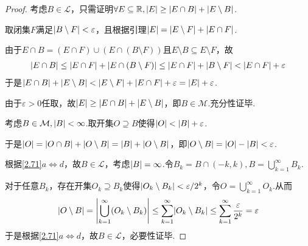 \begin{proof}
    考虑\(B \in \mathcal{L}\)，只需证明\(\forall E \subseteq \mathbb{R}, \abs*{E} \geq \abs*{E \cap B}+\abs*{E \setminus B}\).

    取闭集\(F\)满足\(\abs*{B \setminus F}<\varepsilon\)，且根据引理\(\abs*{E}=\abs*{E \setminus F}+\abs*{E \cap F}\).

    由于\(E \cap B=(E \cap F) \cup (E \cap (B \setminus F))\)且\(E \setminus B \subseteq E \setminus F\)，故
    \begin{align*}
        \abs*{E \cap B} \leq \abs*{E \cap F}+\abs*{E \cap (B \setminus F)} \leq \abs*{E \cap F}+\abs*{B \setminus F}<\abs*{E \cap F}+\varepsilon
    \end{align*}
    于是\(\abs*{E \cap B}+\abs*{E \setminus B}<\abs*{E \setminus F}+\abs*{E \cap F}+\varepsilon=\abs*{E}+\varepsilon\).
    
    由于\(\varepsilon>0\)任取，故\(\abs*{E} \geq \abs*{E \cap B}+\abs*{E \setminus B}\)，即\(B \in \mathcal{M}\).充分性证毕.

    考虑\(B \in \mathcal{M}, \abs*{B}<\infty\).取开集\(O \supseteq B\)使得\(\abs*{O}<\abs*{B}+\varepsilon\).

    于是\(\abs*{O}=\abs*{O \cap B}+\abs*{O \setminus B}=\abs*{B}+\abs*{O \setminus B}\)，即\(\abs*{O \setminus B}=\abs*{O}-\abs*{B}<\varepsilon\).

    根据\cref{2.71}\(a \Leftrightarrow d\)，故\(B \in \mathcal{L}\)，考虑\(\abs*{B}=\infty\).令\(B_k=B \cap (-k,k), B=\bigcup_{k=1}^\infty B_k\).

    对于任意\(B_k\)，存在开集\(O_k \supseteq B_k\)使得\(\abs*{O_k \setminus B_k}<\varepsilon/2^k\)，令\(O=\bigcup_{k=1}^\infty O_k\).从而
    \begin{align*}
        \abs*{O \setminus B}=\abs*{\bigcup_{k=1}^\infty (O_k \setminus B_k)} \leq \sum_{k=1}^\infty \abs*{O_k \setminus B_k} \leq \sum_{k=1}^\infty \frac{\varepsilon}{2^k}=\varepsilon
    \end{align*}
    于是根据\cref{2.71}\(a \Leftrightarrow d\)，故\(B \in \mathcal{L}\)，必要性证毕.
\end{proof}

